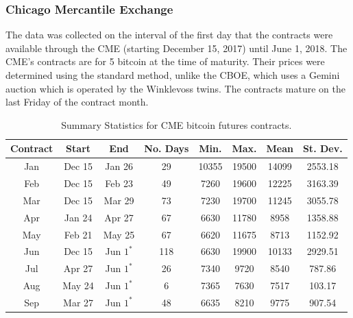 \documentclass{paper}
\begin{document}
\begin{doublespacing}
\subsubsection{Chicago Mercantile Exchange}
The data was collected on the interval of the first day that the contracts were available through the CME (starting December 15, 2017) until June 1, 2018. The CME's contracts are for 5 bitcoin at the time of maturity. Their prices were determined using the standard method, unlike the CBOE, which uses a Gemini auction which is operated by the Winklevoss twins. The contracts mature on the last Friday of the contract month. 

\begin{table}[H]
\centering
\begin{tabular}{|c | c  c | c | c | c | c | c|}\hline
Contract& Start & End & No. Days & Min. & Max. & Mean & St. Dev. \\\hline
Jan & Dec 15 & Jan 26 & 29  & 10355 & 19500 & 14099 & 2553.18 \\
Feb & Dec 15 & Feb 23 & 49  & 7260  & 19600 & 12225 & 3163.39 \\
Mar & Dec 15 & Mar 29 & 73  & 7230  & 19700 & 11245 & 3055.78 \\
Apr & Jan 24 & Apr 27 & 67  & 6630  & 11780 & 8958  & 1358.88 \\
May & Feb 21 & May 25 & 67  & 6620  & 11675 & 8713  & 1152.92 \\
Jun & Dec 15 & Jun $1^{*}$  & 118 & 6630  & 19900 & 10133 & 2929.51 \\ 
Jul & Apr 27 & Jun $1^{*}$  & 26  & 7340  & 9720  & 8540  & 787.86  \\
Aug & May 24 & Jun $1^{*}$  & 6   & 7365  & 7630  & 7517  & 103.17  \\
Sep & Mar 27 & Jun $1^{*}$  & 48  & 6635  & 8210  & 9775  & 907.54  \\\hline
\end{tabular}
\caption{Summary Statistics for CME bitcoin futures contracts.}\label{CME}
\end{table}


\end{doublespacing}
\end{document}
